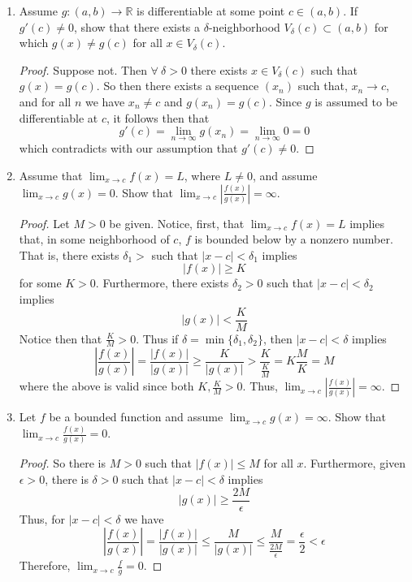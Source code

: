 \begin{enumerate}
\item Assume \( g: (a,b) \rightarrow \mathbb{R} \) is differentiable at some point \( c \in (a,b) \). If \( g'(c) \neq 0 \), show that there exists a \( \delta \)-neighborhood \( V_\delta(c) \subset (a,b) \) for which \( g(x) \neq g(c) \) for all \( x \in V_\delta (c) \). 

\begin{proof}
Suppose not. Then \( \forall \: \delta > 0 \) there exists \( x \in V_\delta(c) \) such that \( g(x) = g(c) \). So then there exists a sequence \( (x_n) \) such that, \( x_n \rightarrow c \), and for all \( n \) we have \( x_n \neq c \) and \( g(x_n) = g(c) \). Since \( g \) is assumed to be differentiable at \( c \), it follows then that
\[
g'(c) = \lim_{n \rightarrow \infty} g(x_n) = \lim_{n \rightarrow \infty} 0 = 0
\]
which contradicts with our assumption that \( g'(c) \neq 0 \).
\end{proof}

\item Assume that \( \lim_{x \rightarrow c} f(x) = L \), where \( L \neq 0 \), and assume \( \lim_{x \rightarrow c} g(x) = 0 \). Show that \( \lim_{x\rightarrow c} \left| \frac{f(x)}{g(x)} \right| = \infty \).

\begin{proof}
Let \( M > 0 \) be given. Notice, first, that \( \lim_{x \rightarrow c} f(x) = L \) implies that, in some neighborhood of \( c \), \( f \) is bounded below by a nonzero number. That is, there exists \( \delta_1 > \) such that \( \vert x -c \vert < \delta_1 \) implies
\[
\vert f(x) \vert \geq K
\]
for some \( K > 0 \). Furthermore, there exists \( \delta_2 > 0 \) such that \( \vert x-c \vert < \delta_2 \) implies
\[
\vert g(x) \vert < \frac{K}{M}
\]
Notice then that \( \frac{K}{M} > 0 \). Thus if \( \delta = \min\{ \delta_1, \delta_2 \} \), then \( \vert x-c \vert < \delta \) implies 
\[
\left| \frac{f(x)}{g(x)} \right| = \frac{\vert f(x) \vert}{\vert g(x) \vert} \geq \frac{K}{\vert g(x)\vert} > \frac{K}{\frac{K}{M}} = K \frac{M}{K} = M
\]
where the above is valid since both \( K, \frac{K}{M} > 0 \). Thus, \( \lim_{x \rightarrow c} \left| \frac{f(x)}{g(x)} \right| = \infty \). 
\end{proof}

\item Let \( f \) be a bounded function and assume \( \lim_{x \rightarrow c} g(x) = \infty \). Show that \( \lim_{x \rightarrow c} \frac{f(x)}{g(x)} = 0 \).
\begin{proof}
So there is \( M > 0 \) such that \( \vert f(x) \vert \leq M \) for all \( x \). Furthermore, given \( \epsilon > 0 \), there is \( \delta> 0 \) such that \( \vert x-c \vert < \delta \) implies
\[
\vert g(x) \vert \geq \frac{2M}{\epsilon}
\]
Thus, for \( \vert x-c \vert < \delta \) we have
\[
\left| \frac{f(x)}{g(x)} \right| = \frac{\vert f(x) \vert}{\vert g(x) \vert} \leq \frac{M}{\vert g(x) \vert} \leq \frac{M}{\frac{2M}{\epsilon}} = \frac{\epsilon}{2} < \epsilon
\]
Therefore, \( \lim_{x \rightarrow c} \frac{f}{g} = 0 \).
\end{proof}



\end{enumerate}
